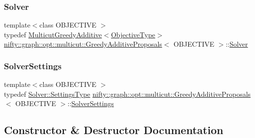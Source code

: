 \subsubsection{\texorpdfstring{Solver}{Solver}}
{\footnotesize\ttfamily template$<$class O\+B\+J\+E\+C\+T\+I\+VE $>$ \\
typedef \hyperlink{classnifty_1_1graph_1_1opt_1_1multicut_1_1MulticutGreedyAdditive}{Multicut\+Greedy\+Additive}$<$\hyperlink{classnifty_1_1graph_1_1opt_1_1multicut_1_1GreedyAdditiveProposals_a8b28464e490d224a3626680692ac2170}{Objective\+Type}$>$ \hyperlink{classnifty_1_1graph_1_1opt_1_1multicut_1_1GreedyAdditiveProposals}{nifty\+::graph\+::opt\+::multicut\+::\+Greedy\+Additive\+Proposals}$<$ O\+B\+J\+E\+C\+T\+I\+VE $>$\+::\hyperlink{classnifty_1_1graph_1_1opt_1_1multicut_1_1GreedyAdditiveProposals_a436b21c4ce1d95f27c50cf7aa9b41b1f}{Solver}}

\mbox{\label{classnifty_1_1graph_1_1opt_1_1multicut_1_1GreedyAdditiveProposals_a7612d756b6f63b2cda337c3d1a0fa4c9}} 
\subsubsection{\texorpdfstring{Solver\+Settings}{SolverSettings}}
{\footnotesize\ttfamily template$<$class O\+B\+J\+E\+C\+T\+I\+VE $>$ \\
typedef \hyperlink{classnifty_1_1graph_1_1opt_1_1multicut_1_1MulticutGreedyAdditive_a074ee39f5884cff7359f5c0997929e2f}{Solver\+::\+Settings\+Type} \hyperlink{classnifty_1_1graph_1_1opt_1_1multicut_1_1GreedyAdditiveProposals}{nifty\+::graph\+::opt\+::multicut\+::\+Greedy\+Additive\+Proposals}$<$ O\+B\+J\+E\+C\+T\+I\+VE $>$\+::\hyperlink{classnifty_1_1graph_1_1opt_1_1multicut_1_1GreedyAdditiveProposals_a7612d756b6f63b2cda337c3d1a0fa4c9}{Solver\+Settings}}



\subsection{Constructor \& Destructor Documentation}
\mbox{\label{classnifty_1_1graph_1_1opt_1_1multicut_1_1GreedyAdditiveProposals_acfd468728e9728e3e4430431f1b4aea8}} 
